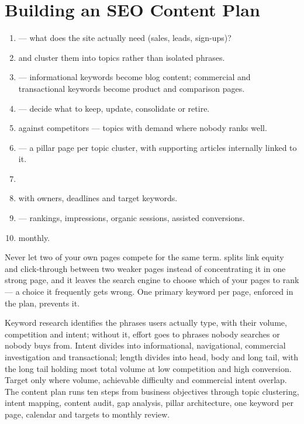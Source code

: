 \section{Building an SEO Content Plan}

\begin{enumerate}
\item {} --- what does the site actually need
      (sales, leads, sign-ups)?
\item {} and cluster them into topics rather than isolated
      phrases.
\item {} --- informational keywords become blog
      content; commercial and transactional keywords become product and
      comparison pages.
\item {} --- decide what to keep, update, consolidate
      or retire.
\item {} against competitors --- topics with demand
      where nobody ranks well.
\item {} --- a pillar page per topic cluster,
      with supporting articles internally linked to it.
\item {}
\item {} with owners, deadlines and target
      keywords.
\item {} --- rankings, impressions, organic sessions,
      assisted conversions.
\item {} monthly.
\end{enumerate}

\begin{warnbox}
Never let two of your own pages compete for the same term.
 splits link equity
and click-through between two weaker pages instead of concentrating it in one
strong page, and it leaves the search engine to choose which of your pages to
rank --- a choice it frequently gets wrong. One primary keyword per page,
enforced in the plan, prevents it.
\end{warnbox}

\begin{summarybox}
Keyword research identifies the phrases users actually type, with their volume,
competition and intent; without it, effort goes to phrases nobody searches or
nobody buys from. Intent divides into informational, navigational, commercial
investigation and transactional; length divides into head, body and long tail,
with the long tail holding most total volume at low competition and high
conversion. Target only where volume, achievable difficulty and commercial intent
overlap. The content plan runs ten steps from business objectives through topic
clustering, intent mapping, content audit, gap analysis, pillar architecture, one
keyword per page, calendar and targets to monthly review.
\end{summarybox}

